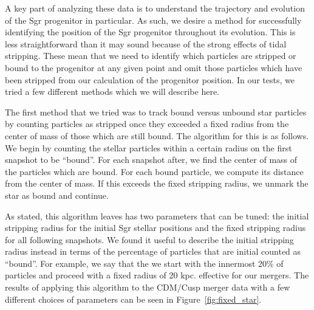 A key part of analyzing these data is to understand the trajectory and
evolution of the Sgr progenitor in particular. As such, we desire a
method for successfully identifying the position of the Sgr progenitor
throughout its evolution. This is less straightforward than it may sound
because of the strong effects of tidal stripping. These mean that we
need to identify which particles are stripped or bound to the progenitor
at any given point and omit those particles which have been stripped
from our calculation of the progenitor position. In our tests, we tried
a few different methods which we will describe here.

The first method that we tried was to track bound versus unbound star
particles by counting particles as stripped once they exceeded a fixed radius
from the center of mass of those which are still bound.  The algorithm for
this is as follows.  We begin by counting the stellar particles within a
certain radius on the first snapshot to be ``bound''.  For each snapshot
after, we find the center of mass of the particles which are bound.  For each
bound particle, we compute its distance from the center of mass.  If this
exceeds the fixed stripping radius, we unmark the star as bound and continue.

As stated, this algorithm leaves has two parameters that can be tuned: the
initial stripping radius for the initial Sgr stellar positions and the fixed
stripping radius for all following snapshots. We found it useful to describe the
initial stripping radius instead in terms of the percentage of particles
that are initial counted as ``bound''. For example, we say that the we start
with the innermost 20\% of particles and proceed with a fixed radius of 20 kpc. 
effective for our mergers. The results of applying this algorithm to the
CDM/Cusp merger data with a few different choices of parameters can be seen in
Figure~\ref{fig:fixed_star}.

